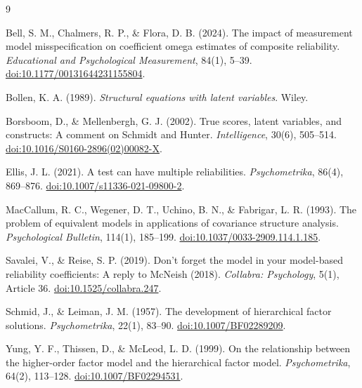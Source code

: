 \documentclass[11pt]{article}
\begin{document}
\begin{thebibliography}{9}

Bell, S. M., Chalmers, R. P., \& Flora, D. B. (2024).
The impact of measurement model misspecification on coefficient omega estimates
of composite reliability.
\emph{Educational and Psychological Measurement}, 84(1), 5--39.
\href{https://doi.org/10.1177/00131644231155804}{doi:10.1177/00131644231155804}.

Bollen, K. A. (1989).
\emph{Structural equations with latent variables}.
Wiley.

Borsboom, D., \& Mellenbergh, G. J. (2002).
True scores, latent variables, and constructs: A comment on Schmidt and Hunter.
\emph{Intelligence}, 30(6), 505--514.
\href{https://doi.org/10.1016/S0160-2896(02)00082-X}{doi:10.1016/S0160-2896(02)00082-X}.

Ellis, J. L. (2021).
A test can have multiple reliabilities.
\emph{Psychometrika}, 86(4), 869--876.
\href{https://doi.org/10.1007/s11336-021-09800-2}{doi:10.1007/s11336-021-09800-2}.

MacCallum, R. C., Wegener, D. T., Uchino, B. N., \& Fabrigar, L. R. (1993).
The problem of equivalent models in applications of covariance structure
analysis.
\emph{Psychological Bulletin}, 114(1), 185--199.
\href{https://doi.org/10.1037/0033-2909.114.1.185}{doi:10.1037/0033-2909.114.1.185}.

Savalei, V., \& Reise, S. P. (2019).
Don't forget the model in your model-based reliability coefficients: A reply to
McNeish (2018).
\emph{Collabra: Psychology}, 5(1), Article 36.
\href{https://doi.org/10.1525/collabra.247}{doi:10.1525/collabra.247}.

Schmid, J., \& Leiman, J. M. (1957).
The development of hierarchical factor solutions.
\emph{Psychometrika}, 22(1), 83--90.
\href{https://doi.org/10.1007/BF02289209}{doi:10.1007/BF02289209}.

Yung, Y. F., Thissen, D., \& McLeod, L. D. (1999).
On the relationship between the higher-order factor model and the hierarchical
factor model.
\emph{Psychometrika}, 64(2), 113--128.
\href{https://doi.org/10.1007/BF02294531}{doi:10.1007/BF02294531}.

\end{thebibliography}

\end{document}
